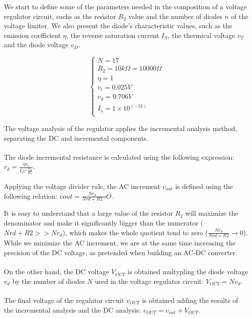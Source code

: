 We start to define some of the parameters needed in the composition of a voltage regulator circuit, suchs as the resistor $R_2$ value and the number of diodes $n$ of the voltage limiter. We also present the diode's characteristic values, such as the emission coefficient $\eta$, the reverse saturation current $I_S$, the thermical voltage $v_T$ and the diode voltage $v_D$.

\[
\left\{\begin{matrix}
N=17\\
R_2=10k\Omega=10 000\Omega\\
\eta=1\\
v_t=0.025 V\\
v_d=0.706 V\\
I_s=1\times10^(-14)\\
\end{matrix}\right.
\]


The voltage analysis of the regulator applies the incremental analysis method, separating the DC and incremental components.

\paragraph{}
The diode incremental resistance is calculated using the following expression: $r_d=\frac{\eta v_t}{I_s e^(\frac{v_d}{\eta v_t}}$.

Applying the voltage divider rule, the AC increment $v_{out}$ is defined using the following relation: $vout=\frac{N r_d}{N rd+R2}vO$.

It is easy to understand that a large value of the resistor $R_2$ will maximize the denominator and make it significantly bigger than the numerator ($N rd+R2 >> N r_d$), which makes the whole quotient tend to zero ($\frac{N r_d}{N rd+R2} \longrightarrow 0$). While we minimize the AC increment, we are at the same time increasing the precision of the DC voltage, as pretended when building an AC-DC converter.

\paragraph{}
On the other hand, the DC voltage $V_{OUT}$ is obtained multypling the diode voltage $v_d$ by the number of diodes $N$ used in the voltage regulator circuit: $V_{OUT}=N v_d$.

\paragraph{}
The final voltage of the regulator circuit $v_{OUT}$ is obtained adding the results of the incremental analysis and the DC analysis: $v_{OUT}=v_{out}+V_{OUT}$.

